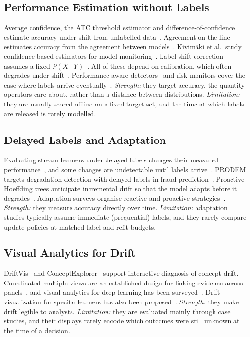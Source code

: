 \subsection{Performance Estimation without Labels}
Average confidence, the ATC threshold estimator and difference-of-confidence estimate
accuracy under shift from unlabelled data~\cite{garg2022atc,guillory2021predicting}.
Agreement-on-the-line estimates accuracy from the agreement between
models~\cite{baek2022agreement}. Kivimäki et al.\ study confidence-based estimators for
model monitoring~\cite{kivimaki2025confidence}. Label-shift correction assumes a fixed
$P(X\mid Y)$~\cite{lipton2018detecting}. All of these depend on calibration, which
often degrades under shift~\cite{guo2017calibration,zadrozny2002transforming,platt2000probabilities}.
Performance-aware detectors~\cite{bayram2022concept} and risk monitors cover the case
where labels arrive eventually~\cite{timans2025risk,zhang2026pprm,pouget2025suitability}.
\emph{Strength:} they target accuracy, the quantity operators care about, rather than
a distance between distributions. \emph{Limitation:} they are usually scored offline
on a fixed target set, and the time at which labels are released is rarely modelled.

\subsection{Delayed Labels and Adaptation}
Evaluating stream learners under delayed labels changes their measured
performance~\cite{grzenda2020delayed}, and some changes are undetectable until labels
arrive~\cite{zliobaite2010change}. PRODEM targets degradation detection with delayed
labels in fraud prediction~\cite{sethi2026prodem}. Proactive Hoeffding trees anticipate
incremental drift so that the model adapts before it degrades~\cite{guerrerocano2026proactive}.
Adaptation surveys organise reactive and proactive strategies~\cite{gama2014survey,lu2019learning}.
\emph{Strength:} they measure accuracy directly over time. \emph{Limitation:}
adaptation studies typically assume immediate (prequential) labels, and they rarely
compare update policies at matched label and refit budgets.

\subsection{Visual Analytics for Drift}
DriftVis~\cite{yang2020driftvis} and ConceptExplorer~\cite{wang2020conceptexplorer}
support interactive diagnosis of concept drift. Coordinated multiple views are an
established design for linking evidence across panels~\cite{roberts2007cmv}, and visual
analytics for deep learning has been surveyed~\cite{hohman2019visual}. Drift
visualization for specific learners has also been proposed~\cite{galmeanu2024svmviz}.
\emph{Strength:} they make drift legible to analysts. \emph{Limitation:} they are
evaluated mainly through case studies, and their displays rarely encode which outcomes
were still unknown at the time of a decision.

